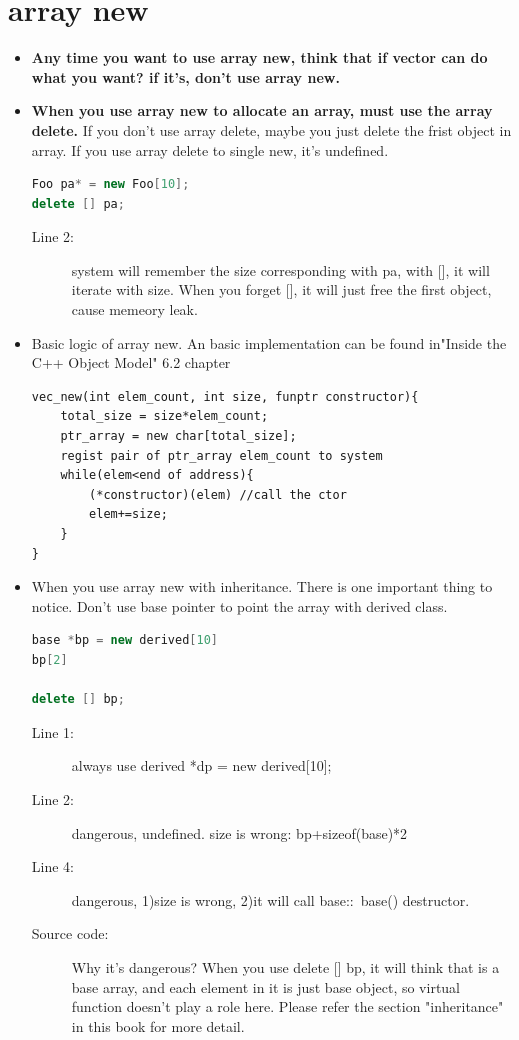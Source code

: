 \documentclass[a4paper,11pt,twoside]{book}
\begin{document}
\section{array new}
\begin{itemize}
	\item \textbf{Any time you want to use array new, think that if vector can do what you want? if it's, don't use array new.}
	
	\item \textbf{When you use array new to allocate an array, must use the array delete.} If you don't use array delete, maybe you just delete the frist object in array. If you use array delete to single new, it's undefined. 
\begin{lstlisting}[frame=single, language=c++]
Foo pa* = new Foo[10];
delete [] pa;
\end{lstlisting}

\begin{description}
	\item[Line 2:] system will remember the size corresponding with pa,  with [], it will iterate with size.  When you forget [], it will just free the first object, cause memeory leak.
\end{description}

	\item Basic logic of array new. An basic implementation can be found in"Inside the C++ Object Model" 6.2 chapter
\begin{lstlisting}[numbers=none]
vec_new(int elem_count, int size, funptr constructor){
	total_size = size*elem_count;
	ptr_array = new char[total_size];
	regist pair of ptr_array elem_count to system
	while(elem<end of address){
		(*constructor)(elem) //call the ctor
		elem+=size;
	}
}
\end{lstlisting}
	
	\item When you use array new with inheritance. There is one important thing to notice. Don't use base pointer to point the array with derived class. 
\begin{lstlisting}[frame=single, language=c++]
base *bp = new derived[10]
bp[2] 
	
delete [] bp;
\end{lstlisting}
\begin{description}
	\item[Line 1:] always use derived *dp = new derived[10];
	\item[Line 2:] dangerous, undefined. size is wrong: bp+sizeof(base)*2
	\item[Line 4:] dangerous, 1)size is wrong, 2)it will call base::~base() destructor. 
	
	\item[Source code:] Why it's dangerous? When you use delete [] bp, it will think that is a base array, and each element in it is just base object, so virtual function doesn't play a role here. Please refer the section "inheritance" in this book for more detail.
\end{description}

\end{itemize}
\end{document}
